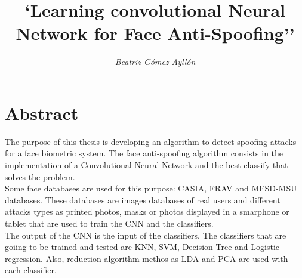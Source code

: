 \documentclass[12pt,a4paper,titlepage,twoside]{book}
\title{\Huge \textbf{`Learning convolutional Neural Network for Face Anti-Spoofing''}}
\author{\Huge \textit{Beatriz G\'omez Ayll\'on}}
\newcommand{\blankpage}{
\newpage \thispagestyle{empty}
\emph{  }
\newpage
}
\begin{document}
\mtcaddchapter %

\frontmatter
\marginsize{3.0cm}{2.0cm}{3.5cm}{2.5cm}


%




%


\maketitle
\blankpage %

%

%	


\chapter*{Abstract}
The purpose of this thesis is developing an algorithm to detect spoofing attacks for a face biometric system. The face anti-spoofing algorithm consists in the implementation of a Convolutional Neural Network and the best classify that solves the problem. \\

Some face databases are used for this purpose: CASIA, FRAV and MFSD-MSU databases. These databases are images databases of real users and different attacks types as printed photos, masks or photos displayed in a smarphone or tablet that are used to train the CNN and the classifiers.\\

The output of the CNN is the input of the classifiers. The classifiers that are goiing to be trained and tested are KNN, SVM, Decision Tree and Logistic regression. Also, reduction algorithm methos as LDA and PCA are used with each classifier.\\
\end{document}
